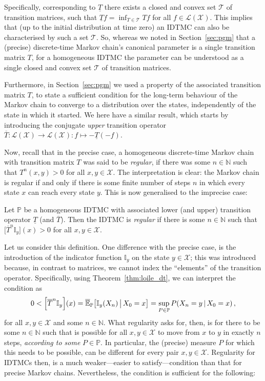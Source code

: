 \documentclass[graybox]{svmult}
\newcommand{\nats}{\mathbb{N}}
\newcommand{\states}{\mathcal{X}}
\newcommand{\gambles}{\mathcal{L}}
\newcommand{\gamblesX}{\gambles(\states)}
\begin{document}
Specifically, corresponding to $\underline{T}$ there exists a closed and convex set $\mathcal{T}$ of transition matrices, such that $\underline{T}f=\inf_{T\in\mathcal{T}}Tf$ for all $f\in\gamblesX$. This implies that (up to the initial distribution at time zero) an IDTMC can also be characterised by such a set $\mathcal{T}$. So, whereas we noted in Section~\ref{sec:pgm} that a (precise) discrete-time Markov chain's canonical parameter is a single transition matrix $T$, for a homogeneous IDTMC the parameter can be understood as a single closed and convex set $\mathcal{T}$ of transition matrices.

Furthermore, in Section~\ref{sec:pgm} we used a property of the associated transition matrix $T$, to state a sufficient condition for the long-term behaviour of the Markov chain to converge to a distribution over the states, independently of the state in which it started. We here have a similar result, which starts by introducing the conjugate \emph{upper} transition operator $\overline{T}:\gamblesX\to\gamblesX:f\mapsto -\underline{T}(-f)$.

Now, recall that in the precise case, a homogeneous discrete-time Markov chain with transition matrix $T$ was said to be \emph{regular}, if there was some $n\in\nats$ such that $T^n(x,y)>0$ for all $x,y\in\states$. The interpretation is clear: the Markov chain is regular if and only if there is some finite number of steps $n$ in which every state $x$ can reach every state $y$. This is now generalised to the imprecise case:
\begin{definition}
Let $\mathbb{P}$ be a homogeneous IDTMC with associated lower (and upper) transition operator $\underline{T}$ (and $\overline{T}$). Then the IDTMC is \emph{regular} if there is some $n\in\nats$ such that $\bigl[\overline{T}^n\mathbb{I}_y\bigr](x)>0$ for all $x,y\in\states$.
\end{definition}
Let us consider this definition. One difference with the precise case, is the introduction of the indicator function $\mathbb{I}_y$ on the state $y\in\states$; this was introduced because, in contrast to matrices, we cannot index the ``elements'' of the transition operator. Specifically, using Theorem~\ref{thm:loile_dt}, we can interpret the condition as
\begin{equation*}
0 < \Bigl[\overline{T}^n\mathbb{I}_y\Bigr](x) = \overline{\mathbb{E}}_\mathbb{P}\bigl[\mathbb{I}_y(X_n)\,\big\vert\,X_0=x\bigr] = \sup_{P\in\mathbb{P}} P(X_n=y\,\vert\,X_0=x)\,,
\end{equation*}
for all $x,y\in\states$ and some $n\in\nats$. What regularity asks for, then, is for there to be some $n\in\nats$ such that is possible for all $x,y\in\states$ to move from $x$ to $y$ in exactly $n$ steps, \emph{according to some} $P\in\mathbb{P}$. In particular, the (precise) measure $P$ for which this needs to be possible, can be different for every pair $x,y\in\states$. Regularity for IDTMCs then, is a much weaker---easier to satisfy---condition than that for precise Markov chains. Nevertheless, the condition is sufficient for the following:
\end{document}

